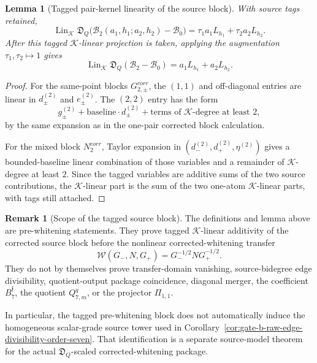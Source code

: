 \documentclass[11pt,a4paper]{amsart}
\def\corr{corr}%
\theoremstyle{plain}
\newtheorem{lemma}[theorem]{Lemma}
\theoremstyle{definition}
\newtheorem{remark}[theorem]{Remark}
\newcommand{\corr}{\mathrm{corr}}
\begin{document}
\begin{lemma}[Tagged pair-kernel linearity of the source block]
\label{lem:tagged-pair-kernel-linearity-source-block}
With source tags retained,
\[
\operatorname{Lin}_{\mathcal K}
\mathfrak D_Q\bigl(\mathcal B_2(a_1,h_1;a_2,h_2)-\mathcal B_0\bigr)
=
\tau_1a_1L_{h_1}+\tau_2a_2L_{h_2}.
\]
After this tagged \(\mathcal K\)-linear projection is taken, applying the
augmentation \(\tau_1,\tau_2\mapsto1\) gives
\[
\operatorname{Lin}_{\mathcal K}
\mathfrak D_Q(\mathcal B_2-\mathcal B_0)
=a_1L_{h_1}+a_2L_{h_2}.
\]
\end{lemma}

\begin{proof}
For the same-point blocks \(G_{2,\pm}^{\corr}\), the \((1,1)\) and
off-diagonal entries are linear in \(d_\pm^{(2)}\) and \(e_\pm^{(2)}\).  The
\((2,2)\) entry has the form
\[
g_\pm^{(2)}
+\text{baseline}\cdot d_\pm^{(2)}
+\text{terms of }\mathcal K\text{-degree at least }2,
\]
by the same expansion as in the one-pair corrected block calculation.

For the mixed block \(N_2^{\corr}\), Taylor expansion in
\((d_-^{(2)},d_+^{(2)},\eta^{(2)})\) gives a bounded-baseline linear
combination of those variables and a remainder of \(\mathcal K\)-degree at
least \(2\).  Since the tagged variables are additive sums of the two source
contributions, the \(\mathcal K\)-linear part is the sum of the two one-atom
\(\mathcal K\)-linear parts, with tags still attached.
\end{proof}

\begin{remark}[Scope of the tagged source block]
\label{rem:scope-tagged-source-block}
The definitions and lemma above are pre-whitening statements.  They prove
tagged \(\mathcal K\)-linear additivity of the corrected source block before
the nonlinear corrected-whitening transfer
\[
\mathcal W(G_-,N,G_+)=G_-^{-1/2}NG_+^{-1/2}.
\]
They do not by themselves prove transfer-domain vanishing,
source-bidegree edge divisibility, quotient-output package coincidence,
diagonal merger, the coefficient \(B_7^{\mathfrak f}\), the quotient
\(Q_{7,m}^q\), or the projector \(\Pi_{1,1}\).

In particular, the tagged pre-whitening block does not automatically induce
the homogeneous scalar-grade source tower used in
Corollary~\ref{cor:gate-b-raw-edge-divisibility-order-seven}.  That
identification is a separate source-model theorem for the actual
\(\mathfrak D_Q\)-scaled corrected-whitening package.
\end{remark}
\end{document}
